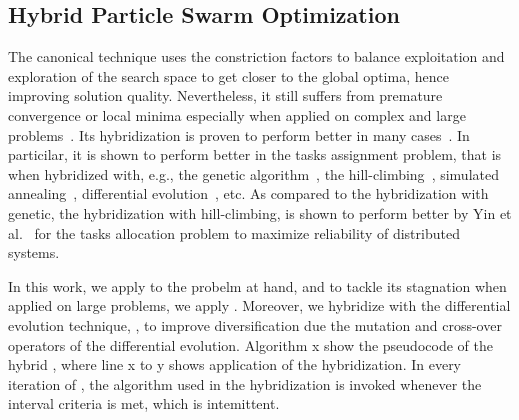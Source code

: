 \subsection{Hybrid Particle Swarm Optimization}
The canonical \pso{} technique uses the constriction factors to balance exploitation and exploration of the search space to get closer to the global optima, hence improving solution quality. Nevertheless, it still suffers from premature convergence or local minima especially when applied on complex and large problems~\cite{Rini2011ParticleChallenges}. Its hybridization is proven to perform better in many cases~\cite{Sengupta2018ParticlePerspectivesb}. In particilar, it is shown to perform better in the tasks assignment problem, that is when hybridized with, e.g., the genetic algorithm~\cite{Optimizing the Task Allocation Step for Multi-Core Processors within AUTOSAR}, the hill-climbing~\cite{yin2007task}, simulated annealing~\cite{A hybrid algorithm based on particle swarm optimization and simulated annealing to holon task allocation for holonic manufacturing system}, differential evolution~\cite{A particle swarm optimization and differential evolution algorithms for job shop scheduling problem}, etc. As compared to the hybridization with genetic, the hybridization with hill-climbing, \hcpso{} is shown to perform better by Yin et al.~\cite{yin2007task} for the tasks allocation problem to maximize reliability of distributed systems. 

In this work, we apply \hcpso to the probelm at hand, and to tackle its stagnation when applied on large problems, we apply \hcpso{}. Moreover, we hybridize \pso with the differential evolution technique, \depso{}, to improve diversification due the mutation and cross-over operators of the differential evolution. Algorithm x show the pseudocode of the hybrid \pso, where line x to y shows application of the hybridization. In every iteration of \pso{}, the algorithm used in the hybridization is invoked whenever the interval criteria is met, which is intemittent.


